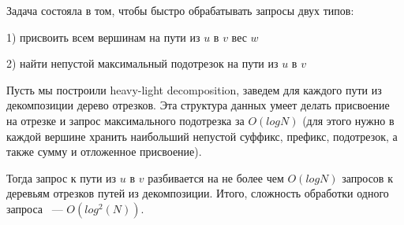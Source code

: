 \documentclass{article}
\begin{document}
Задача состояла в том, чтобы быстро обрабатывать запросы двух типов:

1) присвоить всем вершинам на пути из $u$ в $v$ вес $w$

2) найти непустой максимальный подотрезок на пути из $u$ в $v$

Пусть мы построили heavy-light decomposition, заведем для каждого пути из декомпозиции дерево отрезков.
Эта структура данных умеет делать присвоение на отрезке и запрос максимального подотрезка за $O(logN)$
(для этого нужно в каждой вершине хранить наибольший непустой суффикс, префикс, подотрезок, а также сумму
и отложенное присвоение).

Тогда запрос к пути из $u$ в $v$ разбивается на не более чем $O(logN)$ запросов к деревьям отрезков путей
из декомпозиции.
Итого, сложность обработки одного запроса ~--- $O(log^{2}(N))$.
\end{document}
